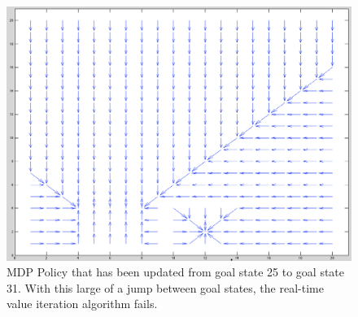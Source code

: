 \documentclass{aiaa-tc}%
\begin{document}
 \begin{figure}[htbp]
   \centering
   \includegraphics[width=170mm]{mdp_policy_update_25_to_31.png} 
   \caption{MDP Policy that has been updated from goal state 25 to goal state 31. With this large of a jump between goal states, the real-time value iteration algorithm fails.}
   \label{fig:sample}
\end{figure}
\clearpage
\end{document}

